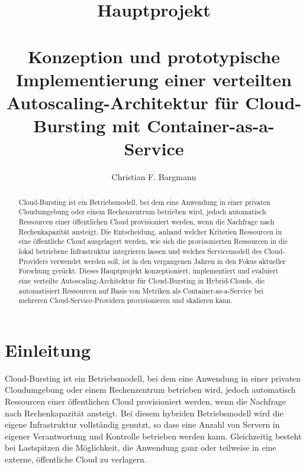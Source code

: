 \documentclass[runningheads]{llncs}
\begin{document}
%
\title{Hauptprojekt \\~\\ Konzeption und prototypische Implementierung einer verteilten Autoscaling-Architektur für Cloud-Bursting mit Container-as-a-Service}
%
%
\author{Christian F. Bargmann}
%
%
%
\maketitle              %
%
\begin{abstract} Cloud-Bursting ist ein Betriebsmodell, bei dem eine Anwendung in einer privaten Cloudumgebung oder einem Rechenzentrum betrieben wird, jedoch automatisch Ressourcen einer öffentlichen Cloud provisioniert werden, wenn die Nachfrage nach Rechenkapazität ansteigt. Die Entscheidung, anhand welcher Kriterien Ressourcen in eine öffentliche Cloud ausgelagert werden, wie sich die provisonierten Ressourcen in die lokal betriebene Infrastruktur integrieren lassen und welches Servicemodell des Cloud-Providers verwendet werden soll, ist in den vergangenen Jahren in den Fokus aktueller Forschung gerückt. Dieses Hauptprojekt konzeptioniert, implementiert und evaluiert eine verteilte Autoscaling-Architektur für Cloud-Bursting in Hybrid-Clouds, die automatisiert Ress\-ourcen auf Basis von Metriken als Container-as-a-Service bei mehreren Cloud-Service-Providern provisionieren und skalieren kann.
		
\end{abstract}
%
%
%
	
\section{Einleitung} \label{motivation}
	
Cloud-Bursting ist ein Betriebsmodell, bei dem eine Anwendung in einer privaten Cloudumgebung oder einem Rechenzentrum betrieben wird, jedoch automatisch Ressourcen einer öffentlichen Cloud provisioniert werden, wenn die Nachfrage nach Rechenkapazität ansteigt. Bei diesem hybriden Betriebsmodell wird die eigene Infrastruktur vollständig genutzt, so dass eine Anzahl von Servern in eigener Verantwortung und Kontrolle betrieben werden kann. Gleichzeitig besteht bei Lastspitzen die Möglichkeit, die Anwendung ganz oder teilweise in eine externe, öffentliche Cloud zu verlagern. \\
	
\end{document}
